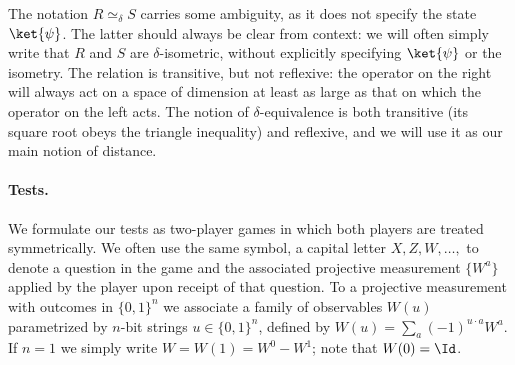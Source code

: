 The notation $R\simeq_\delta S$ carries some ambiguity, as it does not specify the state $\ket{\psi}$. The latter should always be clear from context: we will often simply write that $R$ and $S$ are $\delta$-isometric, without explicitly specifying $\ket{\psi}$ or the isometry. The relation is transitive, but not reflexive: the operator on the right will always act on a space of dimension at least as large as that on which the operator on the left acts. The notion of $\delta$-equivalence is both transitive (its square root obeys the triangle inequality) and reflexive, and we will use it as our main notion of distance. 

\paragraph{Tests.}
We formulate our tests as two-player games in which both players are treated symmetrically.  We often use the same symbol, a capital letter $X,Z,W,\ldots,$ to denote a question in the game and the associated projective measurement $\{W^a\}$ applied by the player upon receipt of that question. To a projective measurement with outcomes in $\{0,1\}^n$ we  associate a family of observables $W(u)$ parametrized by $n$-bit strings $u\in\{0,1\}^n$, defined by $W(u) = \sum_a (-1)^{u\cdot a} W^a$. If $n=1$ we simply write $W=W(1)=W^0-W^1$; note that $W(0)=\Id$.

